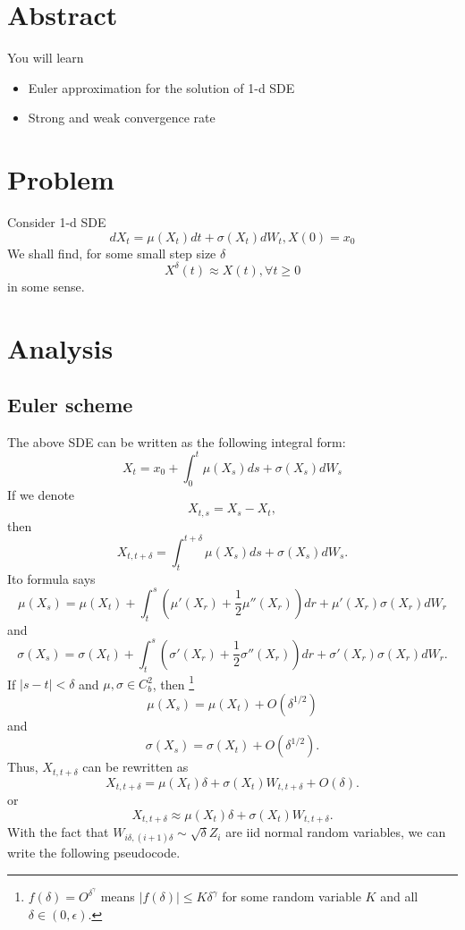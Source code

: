 \documentclass{article}
\begin{document}
\section{Abstract}
You will learn
\begin{itemize}
 \item Euler approximation for the solution of 1-d SDE
 \item Strong and weak convergence rate
\end{itemize}

\section{Problem}

Consider 1-d SDE 
$$d X_{t} = \mu(X_{t}) dt + \sigma(X_{t}) dW_{t}, X(0) = x_{0}$$
We shall find, for some small step size $\delta$
$$X^{\delta} (t) \approx X(t), \forall t\ge 0$$
in some sense.

\section{Analysis}
\subsection{Euler scheme}
The above SDE can be written as the following integral form:
$$
X_{t} = x_{0}  + \int_{0}^{t}  \mu(X_{s}) ds + \sigma(X_{s}) dW_{s}
$$
If we denote 
$$X_{t,s} = X_{s} - X_{t},$$
then 
$$X_{t,t+\delta} = \int_{t}^{t+\delta}  \mu(X_{s}) ds + \sigma(X_{s}) dW_{s}.$$
Ito formula says
$$
\mu(X_{s}) =
\mu(X_{t}) + \int_{t}^{s} (\mu'(X_{r}) + \frac 1 2 \mu''(X_{r})) dr + \mu'(X_{r}) \sigma(X_{r}) dW_{r}
$$
and
$$
\sigma(X_{s}) =
\sigma(X_{t}) + 
\int_{t}^{s} (\sigma'(X_{r}) + \frac 1 2 \sigma''(X_{r})) dr + \sigma'(X_{r}) \sigma(X_{r}) dW_{r}.
$$
If $|s - t| < \delta$ and $\mu, \sigma \in C_{b}^{2}$, then
\footnote{
$f(\delta) = O^{\delta^{\gamma}}$ means 
$|f(\delta)| \le K \delta^{\gamma}$
for some random variable $K$ and all $\delta \in (0, \epsilon)$.
}
$$\mu(X_{s}) = \mu(X_{t}) + O(\delta^{1/2})$$
and 
$$\sigma(X_{s}) = \sigma(X_{t}) + O(\delta^{1/2}).$$
Thus, $X_{t, t+\delta}$ can be rewritten as
$$X_{t, t+\delta} = \mu(X_{t}) \delta + \sigma(X_{t}) W_{t,t+\delta} + O(\delta).
$$
or 
$$
X_{t, t+\delta} \approx \mu(X_{t}) \delta + \sigma(X_{t}) W_{t,t+\delta}.
$$
With the fact that $W_{i \delta, (i+1)\delta} \sim \sqrt \delta Z_{i}$ are iid normal random variables, we can write the following pseudocode.
\end{document}
